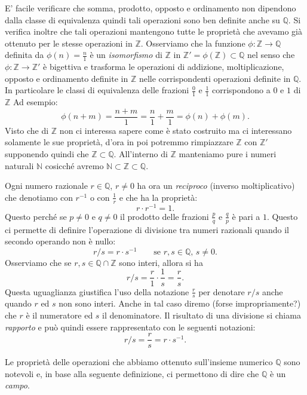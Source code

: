 \documentclass[italian,a4paper,hidelinks,headinclude]{scrartcl}
\newcommand{\NN}{{\mathbb N}}
\newcommand{\ZZ}{{\mathbb Z}}
\newcommand{\QQ}{{\mathbb Q}}
\newcommand{\myemph}[1]{\emph{#1}\marginpar{#1}}
\begin{document}
E' facile verificare che somma, prodotto, opposto  e ordinamento non dipendono
dalla classe di equivalenza quindi tali operazioni sono ben definite
anche su $\QQ$. Si verifica inoltre che tali operazioni mantengono tutte le
proprietà che avevamo già ottenuto per le stesse operazioni in $\ZZ$.
Osserviamo che la funzione $\phi\colon \ZZ \to \QQ$ definita da
$\phi(n) = \frac{n}{1}$ è un \emph{isomorfismo} di $\ZZ$ in
$\ZZ' = \phi(\ZZ)\subset \QQ$ nel senso che $\phi\colon \ZZ \to \ZZ'$ è bigettiva
e trasforma le operazioni di addizione, moltiplicazione, opposto e ordinamento
definite in $\ZZ$ nelle corrispondenti operazioni definite in $\QQ$.
In particolare le classi di equivalenza delle frazioni $\frac{0}{1}$
e $\frac{1}{1}$ corrispondono
a $0$ e $1$ di $\ZZ$
Ad esempio:
\[
  \phi(n+m) = \frac{n+m}{1} = \frac{n}{1} + \frac{m}{1} = \phi(n) + \phi(m).
\]
Visto che di $\ZZ$ non ci interessa sapere come è stato costruito ma ci
interessano solamente le sue proprietà, d'ora in poi potremmo rimpiazzare
$\ZZ$ con $\ZZ'$ supponendo quindi che $\ZZ \subset \QQ$.
All'interno di $\ZZ$
manteniamo pure i numeri naturali $\NN$ cosicché avremo $\NN \subset \ZZ \subset \QQ$.

Ogni numero razionale $r\in \QQ$, $r\neq 0$ ha ora un \emph{reciproco}
(inverso moltiplicativo) che denotiamo con $r^{-1}$ o con $\frac{1}{r}$
e che ha la proprietà:
\[
  r \cdot r^{-1} = 1.
\]
Questo perché se $p\neq 0$ e $q\neq 0$ il prodotto delle frazioni $\frac{p}{q}$
e $\frac q p$ è pari a $1$.
Questo ci permette di definire l'operazione di divisione tra numeri razionali
quando il secondo operando non è nullo:
\[
  r / s = r \cdot s^{-1} \qquad \text{se $r,s \in \QQ$, $s\neq 0$}.
\]
Osserviamo che se $r,s\in \QQ \cap \ZZ$ sono interi, allora si ha
\[
  r / s = \frac{r}{1} \cdot \frac{1}{s} = \frac{r}{s}.
\]
Questa uguaglianza giustifica l'uso della notazione $\frac{r}{s}$ per denotare
$r/s$ anche quando $r$ ed $s$ non sono interi. Anche in tal caso diremo
(forse impropriamente?) che $r$ è il numeratore ed $s$ il denominatore.
Il risultato di una divisione si chiama \myemph{rapporto}
e può quindi essere rappresentato con le seguenti notazioni:
\[
  r/s = \frac{r}{s} = r \cdot s^{-1}.
\]

Le proprietà delle operazioni che abbiamo ottenuto sull'insieme numerico
$\QQ$ sono notevoli e, in base alla seguente definizione, ci permettono
di dire che $\QQ$ è un \emph{campo}.
\end{document}
